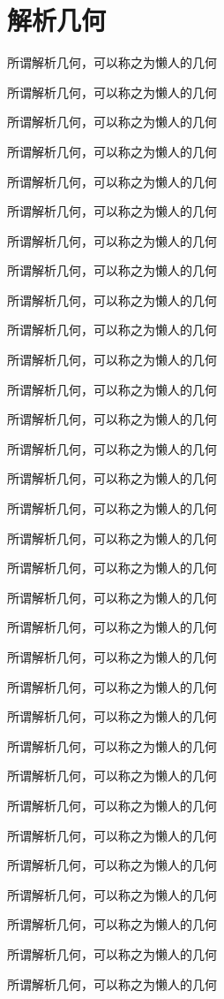 \part{解析几何}
所谓解析几何，可以称之为懒人的几何

所谓解析几何，可以称之为懒人的几何

所谓解析几何，可以称之为懒人的几何

所谓解析几何，可以称之为懒人的几何

所谓解析几何，可以称之为懒人的几何

所谓解析几何，可以称之为懒人的几何

所谓解析几何，可以称之为懒人的几何

所谓解析几何，可以称之为懒人的几何

所谓解析几何，可以称之为懒人的几何

所谓解析几何，可以称之为懒人的几何

所谓解析几何，可以称之为懒人的几何

所谓解析几何，可以称之为懒人的几何

所谓解析几何，可以称之为懒人的几何

所谓解析几何，可以称之为懒人的几何

所谓解析几何，可以称之为懒人的几何

所谓解析几何，可以称之为懒人的几何

所谓解析几何，可以称之为懒人的几何

所谓解析几何，可以称之为懒人的几何

所谓解析几何，可以称之为懒人的几何

所谓解析几何，可以称之为懒人的几何

所谓解析几何，可以称之为懒人的几何

所谓解析几何，可以称之为懒人的几何

所谓解析几何，可以称之为懒人的几何

所谓解析几何，可以称之为懒人的几何

所谓解析几何，可以称之为懒人的几何

所谓解析几何，可以称之为懒人的几何

所谓解析几何，可以称之为懒人的几何

所谓解析几何，可以称之为懒人的几何

所谓解析几何，可以称之为懒人的几何

所谓解析几何，可以称之为懒人的几何

所谓解析几何，可以称之为懒人的几何

所谓解析几何，可以称之为懒人的几何

